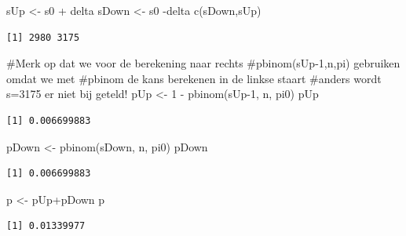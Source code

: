 \documentclass[
  dutch,
  letterpaper,
  12pt]{book}
\newenvironment{Shaded}{\begin{snugshade}}{\end{snugshade}}
\newcommand{\CommentTok}[1]{\textcolor[rgb]{0.37,0.37,0.37}{#1}}
\newcommand{\DecValTok}[1]{\textcolor[rgb]{0.68,0.00,0.00}{#1}}
\newcommand{\FunctionTok}[1]{\textcolor[rgb]{0.28,0.35,0.67}{#1}}
\newcommand{\NormalTok}[1]{\textcolor[rgb]{0.00,0.23,0.31}{#1}}
\newcommand{\OtherTok}[1]{\textcolor[rgb]{0.00,0.23,0.31}{#1}}
\newcommand{\SpecialCharTok}[1]{\textcolor[rgb]{0.37,0.37,0.37}{#1}}
\theoremstyle{definition}
\theoremstyle{definition}
\theoremstyle{definition}
\theoremstyle{remark}
\begin{document}
\begin{Shaded}
\begin{Highlighting}[]
\NormalTok{sUp }\OtherTok{\textless{}{-}}\NormalTok{ s0 }\SpecialCharTok{+}\NormalTok{ delta}
\NormalTok{sDown }\OtherTok{\textless{}{-}}\NormalTok{ s0 }\SpecialCharTok{{-}}\NormalTok{delta}
\FunctionTok{c}\NormalTok{(sDown,sUp)}
\end{Highlighting}
\end{Shaded}

\begin{verbatim}
[1] 2980 3175
\end{verbatim}

\begin{Shaded}
\begin{Highlighting}[]
\CommentTok{\#Merk op dat we voor de berekening naar rechts}
\CommentTok{\#pbinom(sUp{-}1,n,pi) gebruiken omdat we met}
\CommentTok{\#pbinom de kans berekenen in de linkse staart}
\CommentTok{\#anders wordt s=3175 er niet bij geteld!}
\NormalTok{pUp }\OtherTok{\textless{}{-}} \DecValTok{1} \SpecialCharTok{{-}} \FunctionTok{pbinom}\NormalTok{(sUp}\DecValTok{{-}1}\NormalTok{, n, pi0)}
\NormalTok{pUp}
\end{Highlighting}
\end{Shaded}

\begin{verbatim}
[1] 0.006699883
\end{verbatim}

\begin{Shaded}
\begin{Highlighting}[]
\NormalTok{pDown }\OtherTok{\textless{}{-}} \FunctionTok{pbinom}\NormalTok{(sDown, n, pi0)}
\NormalTok{pDown}
\end{Highlighting}
\end{Shaded}

\begin{verbatim}
[1] 0.006699883
\end{verbatim}

\begin{Shaded}
\begin{Highlighting}[]
\NormalTok{p }\OtherTok{\textless{}{-}}\NormalTok{ pUp}\SpecialCharTok{+}\NormalTok{pDown}
\NormalTok{p}
\end{Highlighting}
\end{Shaded}

\begin{verbatim}
[1] 0.01339977
\end{verbatim}
\end{document}
